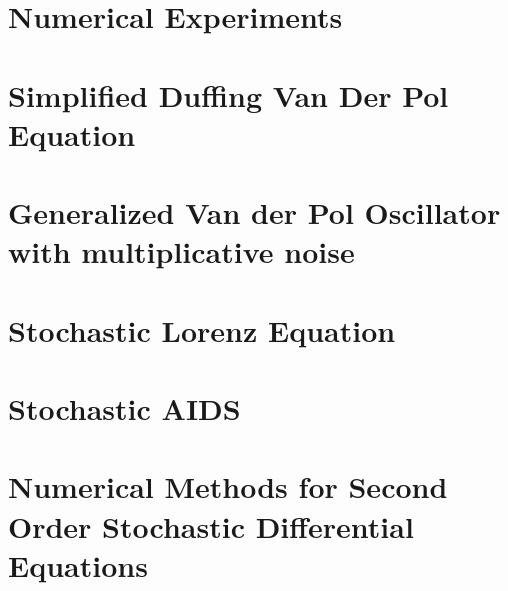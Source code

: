 \section{Numerical Experiments}
	
	
\section{Simplified Duffing Van Der Pol Equation}
	
\section{Generalized Van der Pol Oscillator with multiplicative noise}
	
\section{Stochastic Lorenz Equation}
	
\section{Stochastic AIDS}
	
\section{Numerical Methods for Second Order Stochastic Differential Equations}
	
